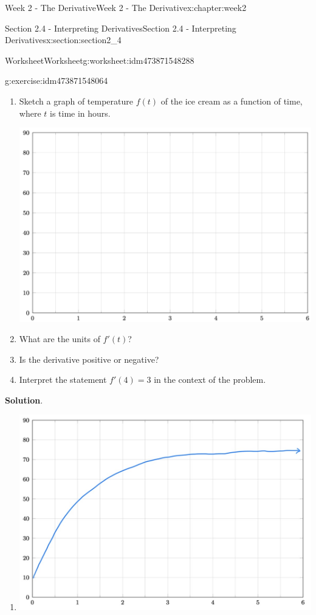 \documentclass[oneside,10pt,]{book}
\newcommand{\blocktitlefont}{\relax}
\numberwithin{equation}{section}
\begin{document}
\begin{chapterptx}{Week 2 - The Derivative}{}{Week 2 - The Derivative}{}{}{x:chapter:week2}
\begin{sectionptx}{Section 2.4 - Interpreting Derivatives}{}{Section 2.4 - Interpreting Derivatives}{}{}{x:section:section2_4}
\begin{worksheet-subsection}{Worksheet}{}{Worksheet}{}{}{g:worksheet:idm473871548288}
\begin{divisionexercise}{1}{}{}{g:exercise:idm473871548064}
\begin{enumerate}[label=(\alph*)]
\item{}Sketch a graph of temperature \(f(t)\) of the ice cream as a function of time, where \(t\) is time in hours.%
\par
\begin{image}{0}{1}{0}%
\includegraphics[width=\linewidth]{images/Math140WkshtInterpretingDerivativesG1.png}
\end{image}%
%
\item{}What are the units of \(f'(t)\)?%
\item{}Is the derivative positive or negative?%
\item{}Interpret the statement \(f'(4)=3\) in the context of the problem.%
\end{enumerate}
\textbf{\blocktitlefont Solution}.\hypertarget{g:solution:idm473871546896}{}\quad{}%
\begin{enumerate}[label=(\alph*)]
\item{}\begin{image}{0}{1}{0}%
\includegraphics[width=\linewidth]{images/Math140WkshtInterpretingDerivativesG2.JPG}

\end{image}
\end{enumerate}
\end{divisionexercise}
\end{worksheet-subsection}
\end{sectionptx}
\end{chapterptx}
\end{document}
